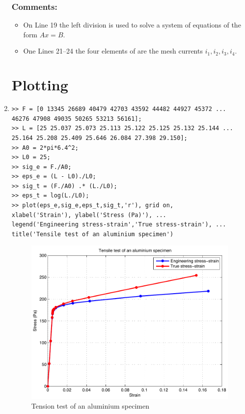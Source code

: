 \begin{enumerate}
\subsubsection{Comments:}
\begin{itemize}
\item On Line 19 the left division is used to solve a system of equations of the form $Ax = B$.
\item One Lines 21--24 the four elements of  are the mesh currents $i_1, i_2, i_3, i_4$.
\end{itemize}

\clearpage
\section*{Plotting}
\item
\begin{lstlisting}
>> F = [0 13345 26689 40479 42703 43592 44482 44927 45372 ...
46276 47908 49035 50265 53213 56161];
>> L = [25 25.037 25.073 25.113 25.122 25.125 25.132 25.144 ...
25.164 25.208 25.409 25.646 26.084 27.398 29.150];
>> A0 = 2*pi*6.4^2;
>> L0 = 25;
>> sig_e = F./A0;
>> eps_e = (L - L0)./L0;
>> sig_t = (F./A0) .* (L./L0);
>> eps_t = log(L./L0);
>> plot(eps_e,sig_e,eps_t,sig_t,'r'), grid on, 
xlabel('Strain'), ylabel('Stress (Pa)'), ...
legend('Engineering stress-strain','True stress-strain'), ...
title('Tensile test of an aluminium specimen')
\end{lstlisting}
\begin{figure}[h]
	\myfloatalign
	\includegraphics[width=\linewidth]{Graphics/Additional-Ex/tension-test-plot}
	\caption{Tension test of an aluminium specimen}
	\label{fig:tension-test-plot}
\end{figure}


\end{enumerate}
